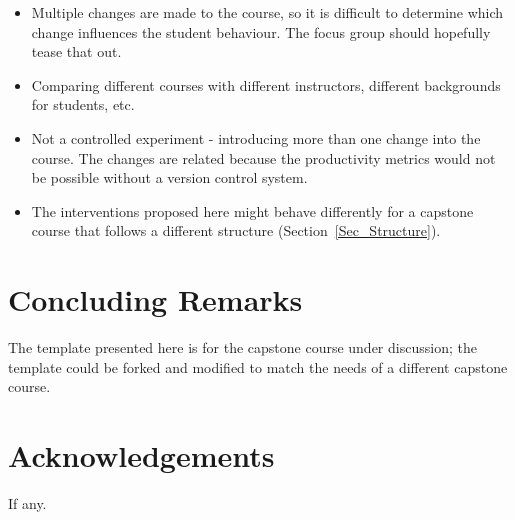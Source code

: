 \documentclass[10pt, conference]{IEEEtran}
\begin{document}
\begin{itemize}
    \item Multiple changes are made to the course, so it is difficult to
    determine which change influences the student behaviour.  The focus group
    should hopefully tease that out.
    \item Comparing different courses with different instructors, different
    backgrounds for students, etc.
    \item Not a controlled experiment - introducing more than one change into
    the course.  The changes are related because the productivity metrics would
    not be possible without a version control system.
    \item The interventions proposed here might behave differently for a
    capstone course that follows a different structure
    (Section~\ref{Sec_Structure}).
\end{itemize}

\section{Concluding Remarks} \label{SecConclusions}

The template presented here is for the capstone course under discussion; the
template could be forked and modified to match the needs of a different capstone
course.

\section*{Acknowledgements}

If any.



\end{document}

